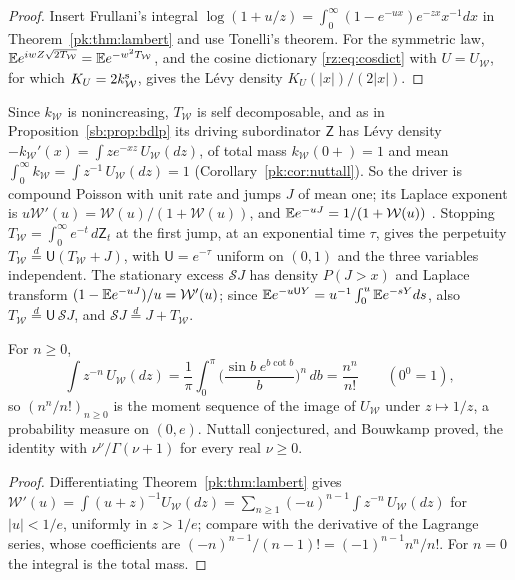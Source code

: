 \begin{proof}
Insert Frullani's integral $\log(1+u/z)=\int_0^\infty(1-e^{-ux})e^{-zx}x^{-1}dx$ in Theorem~\ref{pk:thm:lambert} and use Tonelli's theorem. For the symmetric law, $\mathbb{E} e^{iwZ\sqrt{2T_{\mathcal W}}}=\mathbb{E} e^{-w^2T_{\mathcal W}}$, and the cosine dictionary \eqref{rz:eq:cosdict} with $U=U_{\mathcal W}$, for which $K_U=2k^{\rm s}_{\mathcal W}$, gives the L\'evy density $K_U(|x|)/(2|x|)$.
\end{proof}

\begin{remark}\label{pk:rem:sd}
Since $k_{\mathcal W}$ is nonincreasing, $T_{\mathcal W}$ is self decomposable, and as in Proposition~\ref{sb:prop:bdlp} its driving subordinator $\mathsf Z$ has L\'evy density $-k_{\mathcal W}'(x)=\int ze^{-xz}\,U_{\mathcal W}(dz)$, of total mass $k_{\mathcal W}(0+)=1$ and mean $\int_0^\infty k_{\mathcal W}=\int z^{-1}\,U_{\mathcal W}(dz)=1$ (Corollary~\ref{pk:cor:nuttall}). So the driver is compound Poisson with unit rate and jumps $J$ of mean one; its Laplace exponent is $u\mathcal W'(u)=\mathcal W(u)/(1+\mathcal W(u))$, and $\mathbb{E} e^{-uJ}=1/(1+\mathcal W(u))$ \cite[(5), (6), (18)]{Pakes26}. Stopping $T_{\mathcal W}=\int_0^\infty e^{-t}\,d\mathsf Z_t$ at the first jump, at an exponential time $\tau$, gives the perpetuity $T_{\mathcal W}\stackrel d=\mathsf U(T_{\mathcal W}+J)$, with $\mathsf U=e^{-\tau}$ uniform on $(0,1)$ and the three variables independent. The stationary excess $\mathcal SJ$ has density $P(J>x)$ and Laplace transform $(1-\mathbb{E} e^{-uJ})/u=\mathcal W'(u)$; since $\mathbb{E} e^{-u\mathsf UY}=u^{-1}\int_0^u\mathbb{E} e^{-sY}ds$, also $T_{\mathcal W}\stackrel d=\mathsf U\,\mathcal SJ$, and $\mathcal SJ\stackrel d=J+T_{\mathcal W}$.
\end{remark}

\begin{corollary}\label{pk:cor:nuttall}
For $n\ge0$,
\[
\int z^{-n}\,U_{\mathcal W}(dz)=\frac1\pi\int_0^\pi\Big(\frac{\sin b\;e^{b\cot b}}b\Big)^n\,db=\frac{n^n}{n!}\qquad(0^0=1),
\]
so $(n^n/n!)_{n\ge0}$ is the moment sequence of the image of $U_{\mathcal W}$ under $z\mapsto1/z$, a probability measure on $(0,e)$. Nuttall conjectured, and Bouwkamp proved, the identity with $\nu^\nu/\Gamma(\nu+1)$ for every real $\nu\ge0$.
\end{corollary}

\begin{proof}
Differentiating Theorem~\ref{pk:thm:lambert} gives $\mathcal W'(u)=\int(u+z)^{-1}U_{\mathcal W}(dz)=\sum_{n\ge1}(-u)^{n-1}\int z^{-n}\,U_{\mathcal W}(dz)$ for $|u|<1/e$, uniformly in $z>1/e$; compare with the derivative of the Lagrange series, whose coefficients are $(-n)^{n-1}/(n-1)!=(-1)^{n-1}n^n/n!$. For $n=0$ the integral is the total mass.
\end{proof}


